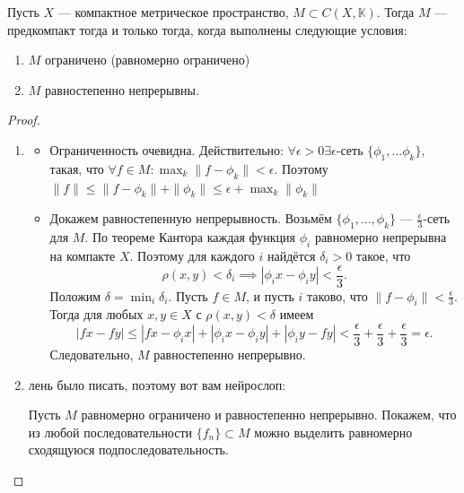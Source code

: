 \begin{theorem}
    Пусть \(X\) --- компактное метрическое пространство, \(M \subset C(X, \mathbb{K})\). Тогда \(M\) --- предкомпакт тогда и только тогда, когда выполнены следующие условия:
    \begin{enumerate}
        \item \(M\) ограничено (равномерно ограничено)
        \item \(M\) равностепенно непрерывны.
    \end{enumerate}
\end{theorem}
\begin{proof}\indent
    \begin{enumerate}
        \item[\(\Ra\)]
        \begin{itemize}
            \item Ограниченность очевидна. Действительно: \(\forall \epsilon > 0 \exists \epsilon\)-сеть \(\{\phi_1, \dots \phi_k\}\), такая, что \(\forall f \in M: \max_k \|f - \phi_k\| < \epsilon\). Поэтому \(\|f\| \le \|f - \phi_k\| + \|\phi_k\| \le \epsilon + \max_k\|\phi_k\|\)
            \item Докажем равностепенную непрерывность. Возьмём \(\{\phi_1, \dots, \phi_k\}\) — \(\frac{\epsilon}{3}\)-сеть для \(M\).
            По теореме Кантора каждая функция \(\phi_i\) равномерно непрерывна на компакте \(X\).
            Поэтому для каждого \(i\) найдётся \(\delta_i > 0\) такое, что
            \[
                \rho(x,y) < \delta_i \implies |\phi_ix - \phi_iy| < \frac{\epsilon}{3}.
            \]
            Положим \(\delta = \min_i \delta_i\). Пусть \(f \in M\), и пусть \(i\) таково, что
            \(\|f - \phi_i\| < \frac{\epsilon}{3}\). Тогда для любых \(x,y \in X\) с
            \(\rho(x,y) < \delta\) имеем
            \[
                |fx - fy|
                \le |fx - \phi_ix| + |\phi_ix - \phi_iy| + |\phi_iy - fy|
                < \frac{\epsilon}{3} + \frac{\epsilon}{3} + \frac{\epsilon}{3}
                = \epsilon.
            \]
            Следовательно, \(M\) равностепенно непрерывно.
        \end{itemize}
        \item[\(\La\)] лень было писать, поэтому вот вам нейрослоп: 

        Пусть \(M\) равномерно ограничено и равностепенно непрерывно. Покажем, что из любой последовательности \(\{f_n\}\subset M\) можно выделить равномерно сходящуюся подпоследовательность.


\end{enumerate}
\end{proof}

